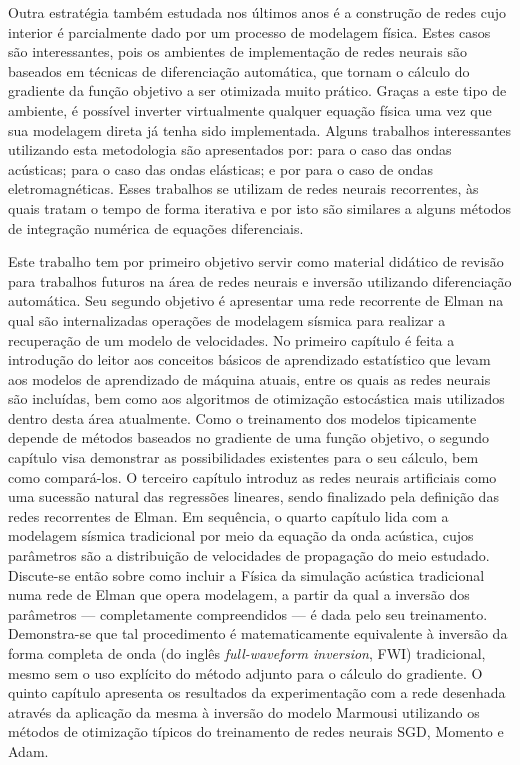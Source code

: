   Outra estratégia também estudada nos últimos anos é a construção de redes cujo interior é parcialmente dado por um processo de modelagem física. Estes casos são interessantes, pois os ambientes de implementação de redes neurais são baseados em técnicas de diferenciação automática, que tornam o cálculo do gradiente da função objetivo a ser otimizada muito prático. Graças a este tipo de ambiente, é possível inverter virtualmente qualquer equação física uma vez que sua modelagem direta já tenha sido implementada. Alguns trabalhos interessantes utilizando esta metodologia são apresentados por:  para o caso das ondas acústicas;  para o caso das ondas elásticas; e por  para o caso de ondas eletromagnéticas. Esses trabalhos se utilizam de redes neurais recorrentes, às quais tratam o tempo de forma iterativa e por isto são similares a alguns métodos de integração numérica de equações diferenciais.

  Este trabalho tem por primeiro objetivo servir como material didático de revisão para trabalhos futuros na área de redes neurais e inversão utilizando diferenciação automática. Seu segundo objetivo é apresentar uma rede recorrente de Elman na qual são internalizadas operações de modelagem sísmica para realizar a recuperação de um modelo de velocidades. No primeiro capítulo é feita a introdução do leitor aos conceitos básicos de aprendizado estatístico que levam aos modelos de aprendizado de máquina atuais, entre os quais as redes neurais são incluídas, bem como aos algoritmos de otimização estocástica mais utilizados dentro desta área atualmente. Como o treinamento dos modelos tipicamente depende de métodos baseados no gradiente de uma função objetivo, o segundo capítulo visa demonstrar as possibilidades existentes para o seu cálculo, bem como compará-los. O terceiro capítulo introduz as redes neurais artificiais como uma sucessão natural das regressões lineares, sendo finalizado pela definição das redes recorrentes de Elman. Em sequência, o quarto capítulo lida com a modelagem sísmica tradicional por meio da equação da onda acústica, cujos parâmetros são a distribuição de velocidades de propagação do meio estudado. Discute-se então sobre como incluir a Física da simulação acústica tradicional numa rede de Elman que opera modelagem, a partir da qual a inversão dos parâmetros --- completamente compreendidos --- é dada pelo seu treinamento. Demonstra-se que tal procedimento é matematicamente equivalente à inversão da forma completa de onda (do inglês \textit{full-waveform inversion}, FWI) tradicional, mesmo sem o uso explícito do método adjunto para o cálculo do gradiente. O quinto capítulo apresenta os resultados da experimentação com a rede desenhada através da aplicação da mesma à inversão do modelo Marmousi  utilizando os métodos de otimização típicos do treinamento de redes neurais SGD, Momento e Adam.
